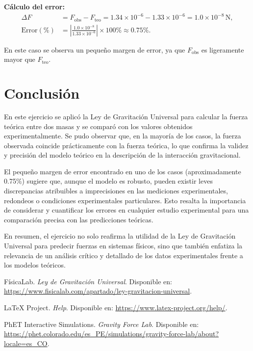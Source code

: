 \documentclass[a4paper,12pt]{article}
\begin{document}
\textbf{Cálculo del error:}
\begin{align*}
\Delta F &= F_{\text{obs}} - F_{\text{teo}} = 1.34 \times 10^{-6} - 1.33 \times 10^{-6} = 1.0 \times 10^{-8}\,\text{N}, \\
\text{Error}(\%) &= \left|\frac{1.0 \times 10^{-8}}{1.33 \times 10^{-6}}\right| \times 100\% \approx 0.75\%.
\end{align*}

En este caso se observa un pequeño margen de error, ya que \(F_{\text{obs}}\) es ligeramente mayor que \(F_{\text{teo}}\).


\newpage
\section*{Conclusión}

En este ejercicio se aplicó la Ley de Gravitación Universal para calcular la fuerza teórica entre dos masas y se comparó con los valores obtenidos experimentalmente. Se pudo observar que, en la mayoría de los casos, la fuerza observada coincide prácticamente con la fuerza teórica, lo que confirma la validez y precisión del modelo teórico en la descripción de la interacción gravitacional.

El pequeño margen de error encontrado en uno de los casos (aproximadamente 0.75\%) sugiere que, aunque el modelo es robusto, pueden existir leves discrepancias atribuibles a imprecisiones en las mediciones experimentales, redondeos o condiciones experimentales particulares. Esto resalta la importancia de considerar y cuantificar los errores en cualquier estudio experimental para una comparación precisa con las predicciones teóricas.

En resumen, el ejercicio no solo reafirma la utilidad de la Ley de Gravitación Universal para predecir fuerzas en sistemas físicos, sino que también enfatiza la relevancia de un análisis crítico y detallado de los datos experimentales frente a los modelos teóricos.

\newpage
\begin{thebibliography}{9}
    FísicaLab. \textit{Ley de Gravitación Universal}. Disponible en: \url{https://www.fisicalab.com/apartado/ley-gravitacion-universal}.
    
    LaTeX Project. \textit{Help}. Disponible en: \url{https://www.latex-project.org/help/}.
    
    PhET Interactive Simulations. \textit{Gravity Force Lab}. Disponible en: \url{https://phet.colorado.edu/es_PE/simulations/gravity-force-lab/about?locale=es_CO}.
\end{thebibliography}
\end{document}
